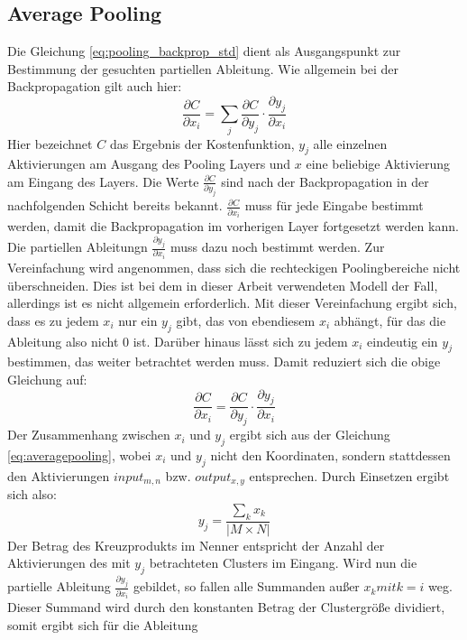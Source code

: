 \documentclass[../main.tex]{subfiles}
\begin{document}
\subsection{Average Pooling}
Die Gleichung \ref{eq:pooling_backprop_std} dient als Ausgangspunkt zur Bestimmung der gesuchten partiellen Ableitung. Wie allgemein bei der Backpropagation gilt auch hier: 
\begin{equation} \label{eq:pooling_backprop_std}
\frac{\partial C}{\partial x_i} = \sum\limits_{j} \frac{\partial C}{\partial y_j} \cdot \frac{\partial y_j}{\partial x_i}
\end{equation}
Hier bezeichnet \(C\) das Ergebnis der Kostenfunktion, \(y_j\) alle einzelnen Aktivierungen am Ausgang des Pooling Layers und \(x\) eine beliebige Aktivierung am Eingang des Layers. Die Werte \(\frac{\partial C}{\partial y_j}\) sind nach der Backpropagation in der nachfolgenden Schicht bereits bekannt. \(\frac{\partial C}{\partial x_i}\) muss für jede Eingabe bestimmt werden, damit die Backpropagation im vorherigen Layer fortgesetzt werden kann. Die partiellen Ableitungn \(\frac{\partial y_j}{\partial x_i}\) muss dazu noch bestimmt werden. Zur Vereinfachung wird angenommen, dass sich die rechteckigen Poolingbereiche nicht überschneiden. Dies ist bei dem in dieser Arbeit verwendeten Modell der Fall, allerdings ist es nicht allgemein erforderlich. Mit dieser Vereinfachung ergibt sich, dass es zu jedem \(x_i\) nur ein \(y_j\) gibt, das von ebendiesem \(x_i\) abhängt, für das die Ableitung also nicht \(0\) ist. Darüber hinaus lässt sich zu jedem \(x_i\) eindeutig ein \(y_j\) bestimmen, das weiter betrachtet werden muss. Damit reduziert sich die obige Gleichung auf:
\begin{equation} \label{eq:pooling_backprop_simplified}
\frac{\partial C}{\partial x_i} = \frac{\partial C}{\partial y_j} \cdot \frac{\partial y_j}{\partial x_i}
\end{equation}
Der Zusammenhang zwischen \(x_i\) und \(y_j\) ergibt sich aus der Gleichung \ref{eq:averagepooling}, wobei \(x_i\) und \(y_j\) nicht den Koordinaten, sondern stattdessen den Aktivierungen \(input_{m, n}\) bzw. \(output_{x, y}\) entsprechen. Durch Einsetzen ergibt sich also: 
\begin{equation}
y_j = \frac{\sum\limits_{k} x_k}{|M\times{N}|}
\end{equation}
Der Betrag des Kreuzprodukts im Nenner entspricht der Anzahl der Aktivierungen des mit \(y_j\) betrachteten Clusters im Eingang. Wird nun die partielle Ableitung \(\frac{\partial y_j}{\partial x_i}\) gebildet, so fallen alle Summanden außer \(x_k mit k=i\) weg. Dieser Summand wird durch den konstanten Betrag der Clustergröße dividiert, somit ergibt sich für die Ableitung
\end{document}
